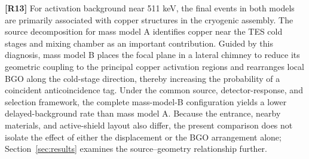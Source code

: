 \documentclass[11pt]{article}
\begin{document}
\begingroup
\color{revisionblue}
\noindent\textbf{[R13]} For activation background near 511 keV, the final
events in both models are primarily associated with copper structures in the
cryogenic assembly. The source decomposition for mass model A identifies
copper near the TES cold stages and mixing chamber as an important
contribution. Guided by this diagnosis, mass model B places the focal plane in
a lateral chimney to reduce its geometric coupling to the principal copper
activation regions and rearranges local BGO along the cold-stage direction,
thereby increasing the probability of a coincident anticoincidence tag. Under
the common source, detector-response, and selection framework, the complete
mass-model-B configuration yields a lower delayed-background rate than mass
model A. Because the entrance, nearby materials, and active-shield layout also
differ, the present comparison does not isolate the effect of either the
displacement or the BGO arrangement alone; Section~\ref{sec:results} examines
the source--geometry relationship further.
\endgroup
\end{document}

